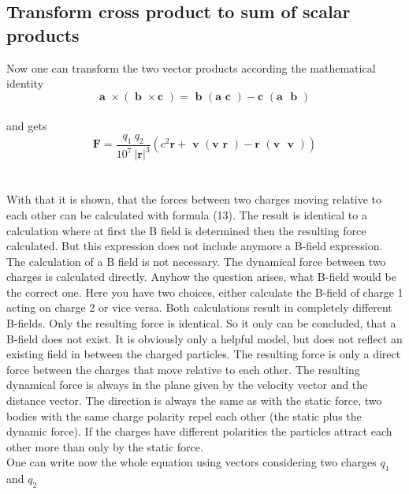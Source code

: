 \documentclass[10pt,titlepage]{article}
\begin{document}
\subsection{Transform cross product to sum of scalar products}
Now one can transform the two vector products according the mathematical identity
\begin{equation}
\textbf{a }\times (\textbf{ b } \times  \textbf{c })=\textbf{ b }(\textbf{a }\textbf{c }) - \textbf{c }(\textbf{a }\textbf{ b })
\end{equation}
\\
and gets
\begin{equation}
\textbf{F} = \frac{q_1 \ q_2}{10^7 \ \vert\textbf{r}\vert^3}  (c^2\textbf{r}  +   \textbf{ v }(\textbf{v }\textbf{r }) - \textbf{r }(\textbf{v }\textbf{ v }))
\end{equation}
\\\\
With that it is shown, that the forces between two charges moving relative to each other can be calculated with formula (13). The result is identical to a calculation where at first the B field is determined then the resulting force calculated.
But this expression does not include anymore a B-field expression. The calculation of a B field is not necessary.
The dynamical force between two charges is calculated directly. Anyhow the question arises, what B-field would be the correct one. Here you have two choices, either calculate the B-field of charge 1 acting on charge 2 or vice versa. Both calculations result in completely different B-fields. Only the resulting force is identical. So it only can be concluded, that a B-field does not exist. It is obviously only a helpful model, but does not reflect an existing field in between the charged particles.
The resulting force is only a direct force between the charges that move relative to each other. The resulting dynamical force is always in the plane given by the velocity vector and the distance vector. The direction is always the same as with the static force, two bodies with the same charge polarity repel each other (the static plus the dynamic force). If the charges have different polarities the particles attract each other more than only by the static force.
\\
One can write now the whole equation using vectors considering two charges
$q_1$ and $q_2$
\end{document}
